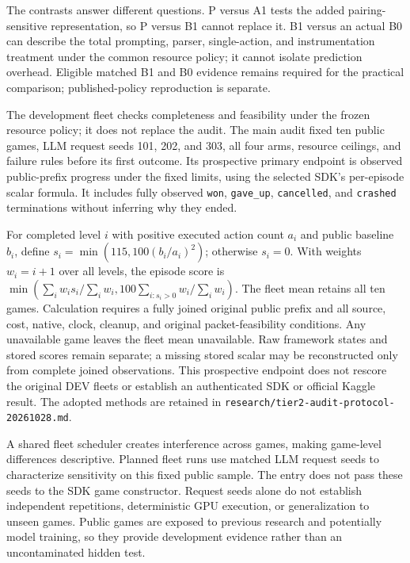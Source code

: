 \documentclass[11pt]{article}
\begin{document}
The contrasts answer different questions. P versus A1 tests the added pairing-sensitive representation, so P versus B1 cannot replace it. B1 versus an actual B0 can describe the total prompting, parser, single-action, and instrumentation treatment under the common resource policy; it cannot isolate prediction overhead. Eligible matched B1 and B0 evidence remains required for the practical comparison; published-policy reproduction is separate.

The development fleet checks completeness and feasibility under the frozen resource policy; it does not replace the audit. The main audit fixed ten public games, LLM request seeds 101, 202, and 303, all four arms, resource ceilings, and failure rules before its first outcome. Its prospective primary endpoint is observed public-prefix progress under the fixed limits, using the selected SDK's per-episode scalar formula. It includes fully observed \texttt{won}, \texttt{gave\_up}, \texttt{cancelled}, and \texttt{crashed} terminations without inferring why they ended.

For completed level $i$ with positive executed action count $a_i$ and public baseline $b_i$, define $s_i=\min(115,100(b_i/a_i)^2)$; otherwise $s_i=0$. With weights $w_i=i+1$ over all levels, the episode score is $\min(\sum_i w_i s_i/\sum_i w_i,100\sum_{i:s_i>0}w_i/\sum_i w_i)$. The fleet mean retains all ten games. Calculation requires a fully joined original public prefix and all source, cost, native, clock, cleanup, and original packet-feasibility conditions. Any unavailable game leaves the fleet mean unavailable. Raw framework states and stored scores remain separate; a missing stored scalar may be reconstructed only from complete joined observations. This prospective endpoint does not rescore the original DEV fleets or establish an authenticated SDK or official Kaggle result. The adopted methods are retained in \texttt{research/tier2-audit-protocol-20261028.md}.

A shared fleet scheduler creates interference across games, making game-level differences descriptive. Planned fleet runs use matched LLM request seeds to characterize sensitivity on this fixed public sample. The entry does not pass these seeds to the SDK game constructor. Request seeds alone do not establish independent repetitions, deterministic GPU execution, or generalization to unseen games. Public games are exposed to previous research and potentially model training, so they provide development evidence rather than an uncontaminated hidden test.
\end{document}
